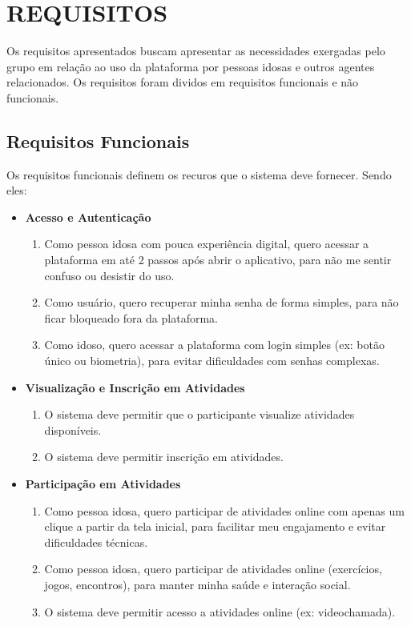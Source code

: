 \newpage
\section{REQUISITOS}
\label{sec:requisitos}
Os requisitos apresentados buscam apresentar as necessidades exergadas pelo grupo em relação ao uso da plataforma por pessoas idosas e outros agentes relacionados. Os requisitos foram dividos em requisitos funcionais e não funcionais.

\subsection{Requisitos Funcionais}
Os requisitos funcionais definem os recuros que o sistema deve fornecer. Sendo eles:

\begin{itemize}
    \item \textbf{Acesso e Autenticação}
        \begin{enumerate}
            \item [US1] Como pessoa idosa com pouca experiência digital, quero acessar a plataforma em até 2 passos após abrir o aplicativo, para não me sentir confuso ou desistir do uso.
            \item [US2] Como usuário, quero recuperar minha senha de forma simples, para não ficar bloqueado fora da plataforma.
            \item [US3] Como idoso, quero acessar a plataforma com login simples (ex: botão único ou biometria), para evitar dificuldades com senhas complexas.
        \end{enumerate}
 
    \item \textbf{Visualização e Inscrição em Atividades}
        \begin{enumerate}
            \item [RF1] O sistema deve permitir que o participante visualize atividades disponíveis.
            \item [RF2] O sistema deve permitir inscrição em atividades.
        \end{enumerate}
 
    \item \textbf{Participação em Atividades}
        \begin{enumerate}
            \item [US4] Como pessoa idosa, quero participar de atividades online com apenas um clique a partir da tela inicial, para facilitar meu engajamento e evitar dificuldades técnicas.
            \item [US5] Como pessoa idosa, quero participar de atividades online (exercícios, jogos, encontros), para manter minha saúde e interação social.
            \item [RF3] O sistema deve permitir acesso a atividades online (ex: videochamada).
        \end{enumerate}
 

\end{itemize}
